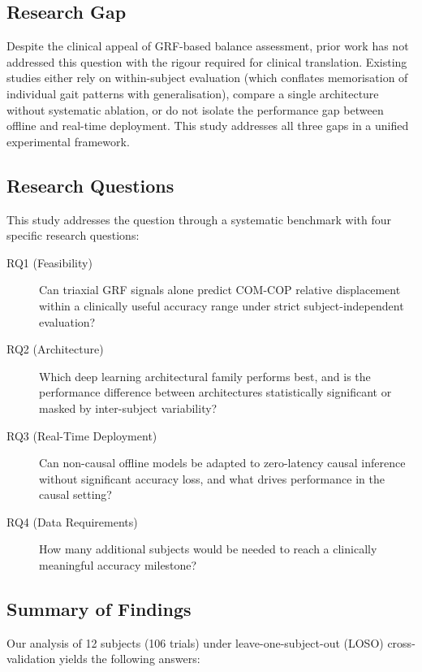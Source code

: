 \documentclass[preprint,12pt]{elsarticle}
\begin{document}
\subsection{Research Gap}

Despite the clinical appeal of GRF-based balance assessment, prior work has not
addressed this question with the rigour required for clinical translation.
Existing studies either rely on within-subject evaluation (which conflates
memorisation of individual gait patterns with generalisation), compare a single
architecture without systematic ablation, or do not isolate the performance gap
between offline and real-time deployment.
This study addresses all three gaps in a unified experimental framework.

\subsection{Research Questions}

This study addresses the question through a systematic benchmark with four
specific research questions:

\begin{description}
  \item[RQ1 (Feasibility)] Can triaxial GRF signals alone predict COM-COP
        relative displacement within a clinically useful accuracy range under
        strict subject-independent evaluation?
  \item[RQ2 (Architecture)] Which deep learning architectural family performs
        best, and is the performance difference between architectures statistically
        significant or masked by inter-subject variability?
  \item[RQ3 (Real-Time Deployment)] Can non-causal offline models be adapted
        to zero-latency causal inference without significant accuracy loss, and
        what drives performance in the causal setting?
  \item[RQ4 (Data Requirements)] How many additional subjects would be needed
        to reach a clinically meaningful accuracy milestone?
\end{description}

\subsection{Summary of Findings}

Our analysis of 12 subjects (106 trials) under leave-one-subject-out (LOSO)
cross-validation yields the following answers:
\end{document}
